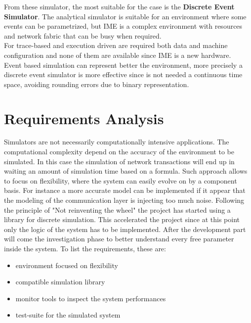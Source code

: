 From these simulator, the most suitable for the case is the \textbf{Discrete
Event Simulator}. The analytical simulator is suitable for an environment where
some events can be parametrized, but IME is a complex environment with resources
and network fabric that can be busy when required. \\
For trace-based and execution driven are required both data and machine
configuration and none of them are available since IME is a new hardware. \\
Event based simulation can represent better the environment, more precisely a
discrete event simulator is more effective since is not needed a continuous time
space, avoiding rounding errors due to binary representation.


\section{Requirements Analysis}\label{requirements}
Simulators are not necessarily computationally intensive applications. The
computational complexity depend on the accuracy of the environment to be
simulated. In this case the simulation of network transactions will end up in
waiting an amount of simulation time based on a formula. 
Such approach allows to focus on flexibility, where the system can easily evolve
on by a component basis. For instance a more accurate model can be implemented
if it appear that the modeling of the communication layer is injecting too much
noise.
Following the principle of "Not reinventing the wheel" the project has started
using a library for discrete simulation. This
accelerated the project since at this point only the logic of the system has to
be implemented. After the development part will come the investigation phase to
better understand every free parameter inside the system.
To list the requirements, these are:
\begin{itemize}
    \item environment focused on flexibility
    \item compatible simulation library
    \item monitor tools to inspect the system performances
    \item test-suite for the simulated system 
\end{itemize}

